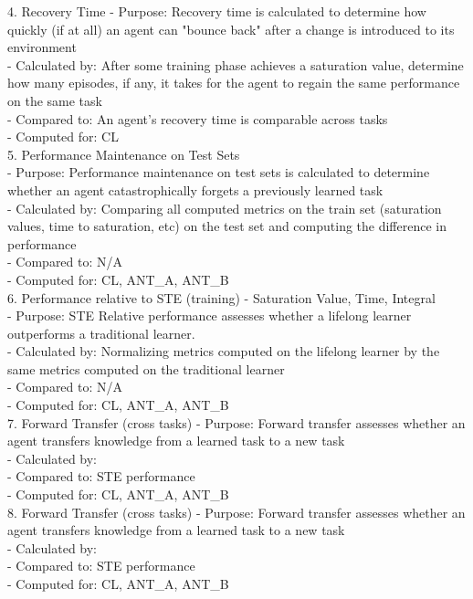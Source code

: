 4. Recovery Time
    - Purpose: Recovery time is calculated to determine how quickly (if at all) an agent can "bounce back" after a change is introduced to its environment\\
    - Calculated by: After some training phase achieves a saturation value, determine how many episodes, if any, it takes for the agent to regain the same performance on the same task\\
    - Compared to: An agent's recovery time is comparable across tasks\\
    - Computed for: CL\\

5. Performance Maintenance on Test Sets\\
    - Purpose: Performance maintenance on test sets is calculated to determine whether an agent catastrophically forgets a previously learned task\\
    - Calculated by: Comparing all computed metrics on the train set (saturation values, time to saturation, etc) on the test set and computing the difference in performance\\
    - Compared to: N/A\\
    - Computed for: CL, ANT\_A, ANT\_B\\

6. Performance relative to STE (training) - Saturation Value, Time, Integral\\
    - Purpose: STE Relative performance assesses whether a lifelong learner outperforms a traditional learner.\\
    - Calculated by: Normalizing metrics computed on the lifelong learner by the same metrics computed on the traditional learner\\
    - Compared to: N/A\\
    - Computed for: CL, ANT\_A, ANT\_B\\

7. Forward Transfer (cross tasks)
    - Purpose: Forward transfer assesses whether an agent transfers knowledge from a learned task to a new task\\ 
    - Calculated by:\\ 
    - Compared to: STE performance\\
    - Computed for: CL, ANT\_A, ANT\_B\\
    
8. Forward Transfer (cross tasks)
    - Purpose: Forward transfer assesses whether an agent transfers knowledge from a learned task to a new task\\
    - Calculated by:\\
    - Compared to: STE performance\\
    - Computed for: CL, ANT\_A, ANT\_B\\

